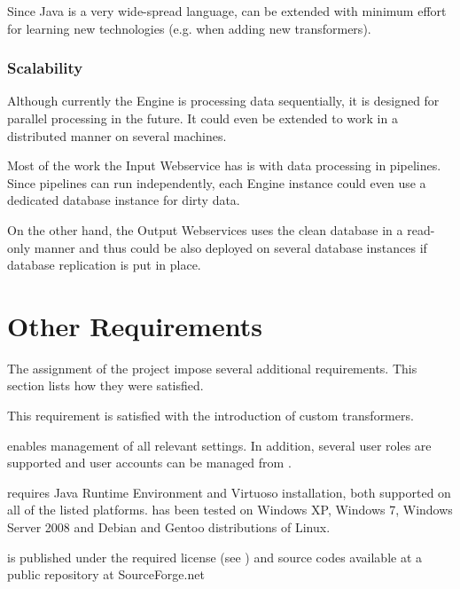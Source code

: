 Since Java is a very wide-spread language, \odcs can be extended with minimum effort for learning new technologies (e.g. when adding new transformers).

\subsubsection{Scalability}
 Although currently the Engine is processing data sequentially, it is designed for parallel processing in the future. It could even be extended to work in a distributed manner on several machines.

 Most of the work the Input Webservice has is with data processing in pipelines. Since pipelines can run independently, each Engine instance could even use a dedicated database instance for dirty data.

 On the other hand, the Output Webservices uses the clean database in a read-only manner and thus could be also deployed on several database instances if database replication is put in place.

\section{Other Requirements}
The assignment of the project impose several additional requirements. This section lists how they were satisfied.

 This requirement is satisfied with the introduction of custom transformers.

 \FE enables management of all relevant settings. In addition, several user roles are supported and user accounts can be managed from \FE.

 \odcs requires Java Runtime Environment and Virtuoso installation, both supported on all of the listed platforms. \odcs has been tested on Windows XP, Windows 7, Windows Server 2008 and Debian and Gentoo distributions of Linux.

 \odcs is published under the required license (see ) and source codes available at a public repository at SourceForge.net

